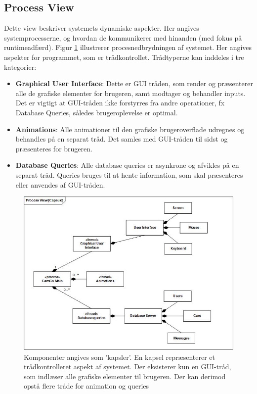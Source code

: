 \documentclass[Rapport/Rapport_main.tex]{subfiles}
\begin{document}
\subsection{Process View}
Dette view beskriver systemets dynamiske aspekter. Her angives systemprocesserne, og hvordan de kommunikerer med hinanden (med fokus på runtimeadfærd). Figur \ref{fig:capsule} illustrerer procesnedbrydningen af systemet. Her angives aspekter for programmet, som er trådkontrollet. Trådtyperne kan inddeles i tre kategorier: 
\begin{itemize}
    \item \textbf{Graphical User Interface}: Dette er GUI tråden, som render og præsenterer alle de grafiske elementer for brugeren, samt modtager og behandler inputs. Det er vigtigt at GUI-tråden ikke forstyrres fra andre operationer, fx Database Queries, således brugeroplevelse er optimal. 
    \item \textbf{Animations}: Alle animationer til den grafiske brugeroverflade udregnes og behandles på en separat tråd. Det samles med GUI-tråden til sidst og præsenteres for brugeren.
    \item \textbf{Database Queries}: Alle database queries er asynkrone og afvikles på en separat tråd. Queries bruges til at hente information, som skal præsenteres eller anvendes af GUI-tråden.
\end{itemize}
\begin{figure}[H]
    \centering
    \includegraphics[width=1\textwidth]{Arkitektur/4+1View/Graphics/ProcessDiagram.jpg}
    \caption{Komponenter angives som 'kapsler'. En kapsel repræsenterer et trådkontrolleret aspekt af systemet. Der eksisterer kun en GUI-tråd, som indlæser alle grafiske elementer til brugeren. Der kan derimod opstå flere tråde for animation og queries}
    \label{fig:capsule}
\end{figure}
\end{document}
